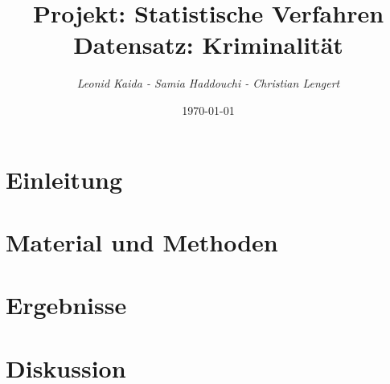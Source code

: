 \documentclass[12pt]{article}
\begin{document}
\title{Projekt: Statistische Verfahren\\
 Datensatz: Kriminalität}
\author{\textsl{Leonid Kaida - Samia Haddouchi - Christian Lengert}}
\date{ \today}
\maketitle
\thispagestyle{empty}
\clearpage
\tableofcontents
\thispagestyle{empty}
\clearpage
\setcounter{page}{1}
\section{Einleitung}

\section{Material und Methoden}

\section{Ergebnisse}

\section{Diskussion}


\clearpage


\nocite{*}
\end{document}
